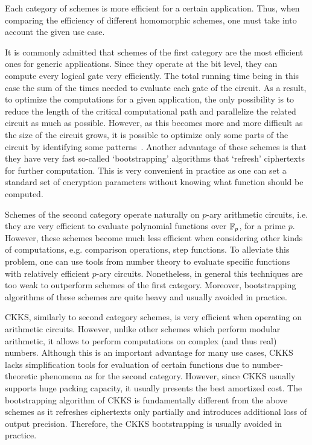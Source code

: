 Each category of schemes is more efficient for a certain application. 
Thus, when comparing the efficiency of different homomorphic schemes, one must take into account the given use case.

It is commonly admitted that schemes of the first category are the most efficient ones for generic applications. 
Since they operate at the bit level, they can compute every logical gate very efficiently. 
The total running time being in this case the sum of the times needed to evaluate each gate of the circuit. 
As a result, to optimize the computations for a given application, the only possibility is to reduce the length of the critical computational path and parallelize the related circuit as much as possible. 
However, as this becomes more and more difficult as the size of the circuit grows, it is possible to optimize only some parts of the circuit by identifying some patterns~\cite{ACS20}.
Another advantage of these schemes is that they have very fast so-called `bootstrapping' algorithms that `refresh' ciphertexts for further computation.
This is very convenient in practice as one can set a standard set of encryption parameters without knowing what function should be computed. 

Schemes of the second category operate naturally on $p$-ary arithmetic circuits, i.e. they are very efficient to evaluate polynomial functions over $\mathbb{F}_p$, for a prime $p$.
However, these schemes become much less efficient when considering other kinds of computations, e.g. comparison operations, step functions. 
To alleviate this problem, one can use tools from number theory to evaluate specific functions with relatively efficient $p$-ary circuits. 
Nonetheless, in general this techniques are too weak to outperform schemes of the first category.
Moreover, bootstrapping algorithms of these schemes are quite heavy and usually avoided in practice. 

CKKS, similarly to second category schemes, is very efficient when operating on arithmetic circuits. 
However, unlike other schemes which perform modular arithmetic, it allows to perform computations on complex (and thus real) numbers. 
Although this is an important advantage for many use cases, CKKS lacks simplification tools for evaluation of certain functions due to number-theoretic phenomena as for the second category. 
However, since CKKS usually supports huge packing capacity, it usually presents the best amortized cost.
The bootstrapping algorithm of CKKS is fundamentally different from the above schemes as it refreshes ciphertexts only partially and introduces additional loss of output precision.
Therefore, the CKKS bootstrapping is usually avoided in practice. 

